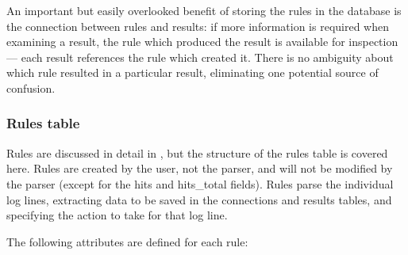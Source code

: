 An important but easily overlooked benefit of storing the rules in the
database is the connection between rules and results: if more information
is required when examining a result, the rule which produced the result is
available for inspection --- each result references the rule which created
it.  There is no ambiguity about which rule resulted in a particular
result, eliminating one potential source of confusion.

\subsubsection{Rules table}

\label{rule attributes}

Rules are discussed in detail in , but the structure of
the rules table is covered here.  Rules are created by the user, not the
parser, and will not be modified by the parser (except for the hits and
hits\_total fields).  Rules parse the individual log lines, extracting data
to be saved in the connections and results tables, and specifying the
action to take for that log line.

The following attributes are defined for each rule:

